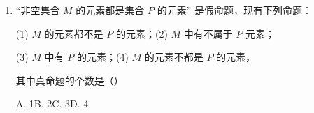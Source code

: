 \begin{enumerate}
\item “非空集合 $M$ 的元素都是集合 $P$ 的元素” 是假命题，现有下列命题：

(1) $M$ 的元素都不是 $P$ 的元素；(2) $M$ 中有不属于 $P$ 元素；%

(3) $M$ 中有 $P$ 的元素；(4) $M$ 的元素不都是 $P$ 的元素，

其中真命题的个数是\mbox{（\quad）}

\keepwithprev
A. 1\qquad B. 2\qquad C. 3\qquad D. 4

\ifanswer
\solbegin
{}
\solend
\fi

\end{enumerate}


